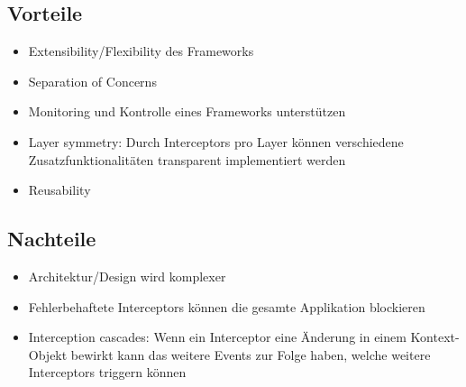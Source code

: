 \subsection{Vorteile}

\begin{itemize}
	\item Extensibility/Flexibility des Frameworks
	\item Separation of Concerns
	\item Monitoring und Kontrolle eines Frameworks unterstützen
	\item Layer symmetry: Durch Interceptors pro Layer können verschiedene Zusatzfunktionalitäten transparent implementiert werden
	\item Reusability
\end{itemize}


\subsection{Nachteile}

\begin{itemize}
	\item Architektur/Design wird komplexer
	\item Fehlerbehaftete Interceptors können die gesamte Applikation blockieren
	\item Interception cascades: Wenn ein Interceptor eine Änderung in einem Kontext-Objekt bewirkt kann das weitere Events zur Folge haben, welche weitere Interceptors triggern können
\end{itemize}
